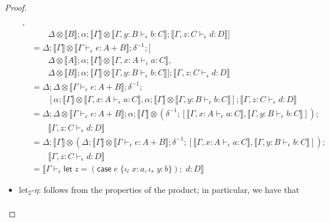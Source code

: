 \documentclass[acmsmall,screen,review]{acmart}
\newcommand{\ms}[1]{\ensuremath{\mathsf{#1}}}
\newcommand{\lto}{:}
\newcommand{\linl}[1]{\iota_l\;{#1}}
\newcommand{\linr}[1]{\iota_r\;{#1}}
\newcommand{\letexpr}[3]{\ensuremath{\ms{let}\;#1 = #2;\;#3}}
\newcommand{\caseexpr}[5]{\ms{case}\;#1\;\{\linl{#2} \lto #3, \linr{#4} \lto #5\}}
\newcommand{\bhyp}[2]{#1 : #2}
\newcommand{\hasty}[4]{#1 \vdash_{#2} #3: {#4}}
\newcommand{\brle}[1]{{\scriptsize\textsf{#1}}}
\newcommand{\dnt}[1]{\llbracket{#1}\rrbracket}
\begin{document}
\begin{proof}
\begin{itemize}
\begin{align*}
            ,
      \\  & \qquad \Delta \otimes \dnt{B} ; \alpha
            ; \dnt{\Gamma} \otimes \dnt{\hasty{\Gamma, \bhyp{y}{B}}{\epsilon}{b}{C}}
            ; \dnt{\hasty{\Gamma, \bhyp{z}{C}}{\epsilon}{d}{D}}
        ]
      \\ &= \Delta ; \dnt{\Gamma} \otimes \dnt{\hasty{\Gamma}{\epsilon}{e}{A + B}} ; \delta^{-1} ; [
      \\ & \qquad \Delta \otimes \dnt{A} ; \alpha
            ; \dnt{\Gamma} \otimes \dnt{\hasty{\Gamma, \bhyp{x}{A}}{\epsilon}{a}{C}}
            ,
      \\  & \qquad \Delta \otimes \dnt{B} ; \alpha
            ; \dnt{\Gamma} \otimes \dnt{\hasty{\Gamma, \bhyp{y}{B}}{\epsilon}{b}{C}}
        ] ; \dnt{\hasty{\Gamma, \bhyp{z}{C}}{\epsilon}{d}{D}}
      \\ &= \Delta ; \Delta \otimes \dnt{\hasty{\Gamma}{\epsilon}{e}{A + B}} ; \delta^{-1} ; 
      \\ & \qquad [
            \alpha ; \dnt{\Gamma} \otimes \dnt{\hasty{\Gamma, \bhyp{x}{A}}{\epsilon}{a}{C}},
            \alpha ; \dnt{\Gamma} \otimes \dnt{\hasty{\Gamma, \bhyp{y}{B}}{\epsilon}{b}{C}}
        ] ; \dnt{\hasty{\Gamma, \bhyp{z}{C}}{\epsilon}{d}{D}}
      \\ &= \Delta ; \Delta \otimes \dnt{\hasty{\Gamma}{\epsilon}{e}{A + B}}  
                   ; \alpha ; \dnt{\Gamma} \otimes (\delta^{-1} ; [
                        \dnt{\hasty{\Gamma, \bhyp{x}{A}}{\epsilon}{a}{C}},
                        \dnt{\hasty{\Gamma, \bhyp{y}{B}}{\epsilon}{b}{C}}
                    ]) ;
      \\ & \qquad \dnt{\hasty{\Gamma, \bhyp{z}{C}}{\epsilon}{d}{D}}
      \\ &= \Delta ; \dnt{\Gamma} \otimes (
                  \Delta ; \dnt{\Gamma} \otimes \dnt{\hasty{\Gamma}{\epsilon}{e}{A + B}} ;
                  \delta^{-1} ; [
                        \dnt{\hasty{\Gamma, \bhyp{x}{A}}{\epsilon}{a}{C}},
                        \dnt{\hasty{\Gamma, \bhyp{y}{B}}{\epsilon}{b}{C}}
                    ]) ;
      \\ & \qquad \dnt{\hasty{\Gamma, \bhyp{z}{C}}{\epsilon}{d}{D}}
      \\ &= \dnt{\hasty{\Gamma}{\epsilon}{\letexpr{z}{(\caseexpr{e}{x}{a}{y}{b})}{d}}{D}}
    \end{align*}
    \item \brle{let$_2$-$\eta$}: follows from the properties of the product; in particular,
    we have that
    \begin{align*}

\end{align*}
\end{itemize}
\end{proof}
\end{document}
